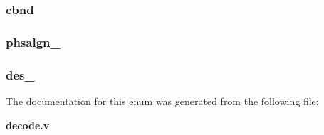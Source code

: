 \subsubsection[{chnlbond}]{ {\bfseries \textcolor{vhdlchar}{cbnd}\textcolor{vhdlchar}{ }} \hspace{0.3cm}}\label{enum1decode_a4d3e4f4d2bf1d3b6ef365c44c64745e0}
\subsubsection[{phsaligner}]{ {\bfseries \textcolor{vhdlchar}{phsalgn\-\_}\textcolor{vhdlchar}{ }} \hspace{0.3cm}}\label{enum1decode_a577a24e7832a45179ec9075138a5195b}
\subsubsection[{serdes\-\_\-1\-\_\-to\-\_\-5\-\_\-diff\-\_\-data}]{ {\bfseries \textcolor{vhdlchar}{des\-\_}\textcolor{vhdlchar}{ }} \hspace{0.3cm}}\label{enum1decode_aa038939ba6c0f4a4d7368cff66327f86}


The documentation for this enum was generated from the following file\-:\begin{DoxyCompactItemize}
\item 
{\bf decode.\-v}\end{DoxyCompactItemize}
